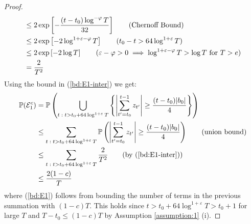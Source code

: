 \begin{proof}
\begin{align}
    &\leq 2 \exp\left[- \frac{(t-t_0)\log^{-\varphi}T}{32}\right] \tag{Chernoff Bound}\\
    &\leq 2 \exp\left[- 2 \log^{1+\varepsilon-\varphi}T\right] \tag{$t_0 - t > 64 \log^{1 + \varepsilon} T$} \\
    &\leq 2 \exp\left[- 2 \log T\right] \tag{$\varepsilon - \varphi > 0 \implies \log^{1+\varepsilon-\varphi}T > \log T$ for $T > e$} \\
    &= \frac{2}{T^2} \label{bd:E1-inter}
\end{align}
Using the bound in (\ref{bd:E1-inter}) we get:
\begin{align}
    \mathbb{P}(\mathcal{E}^c_1) &= \mathbb{P}\left(\bigcup_{ t \;:\; t > t_0 + 64 \log^{1+\varepsilon}T} \left\{\left|\sum_{t'=t_0}^{t-1} z_{t'}\right| \geq \frac{(t-t_0)|b_0|}{4}\right\} \right) \notag \\
    &\leq \sum_{ t \;:\; t > t_0 + 64 \log^{1+\varepsilon}T} \mathbb{P}\left(\left|\sum_{t'=t_0}^{t-1} z_{t'}\right| \geq \frac{(t-t_0) |b_0|}{4}\right) \tag{union bound} \\
    &\leq \sum_{ t \;:\; t > t_0 + 64 \log^{1+\varepsilon}T} \frac{2}{T^2} \tag{by (\ref{bd:E1-inter})}\\
    &\leq \frac{2(1-c)}{T} \label{bd:E1}
\end{align}
where (\ref{bd:E1}) follows from bounding the number of terms in the previous summation with $(1-c)T$. This holds since $t > t_0 + 64 \log^{1+\varepsilon}T > t_0 + 1$ for large $T$ and $T - t_0 \leq (1-c)T$ by Assumption \ref{assumption:1} (i). 


\end{proof}
